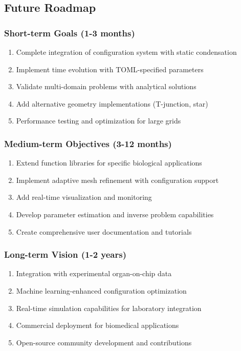 \subsection{Future Roadmap}

\subsubsection{Short-term Goals (1-3 months)}
\begin{enumerate}
    \item Complete integration of configuration system with static condensation
    \item Implement time evolution with TOML-specified parameters
    \item Validate multi-domain problems with analytical solutions
    \item Add alternative geometry implementations (T-junction, star)
    \item Performance testing and optimization for large grids
\end{enumerate}

\subsubsection{Medium-term Objectives (3-12 months)}
\begin{enumerate}
    \item Extend function libraries for specific biological applications
    \item Implement adaptive mesh refinement with configuration support
    \item Add real-time visualization and monitoring
    \item Develop parameter estimation and inverse problem capabilities
    \item Create comprehensive user documentation and tutorials
\end{enumerate}

\subsubsection{Long-term Vision (1-2 years)}
\begin{enumerate}
    \item Integration with experimental organ-on-chip data
    \item Machine learning-enhanced configuration optimization
    \item Real-time simulation capabilities for laboratory integration
    \item Commercial deployment for biomedical applications
    \item Open-source community development and contributions
\end{enumerate}

